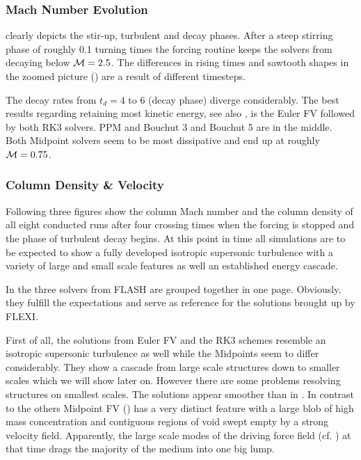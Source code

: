 \subsubsection{Mach Number Evolution}
 clearly depicts the stir-up,
turbulent and decay phases. After a steep stirring phase of roughly 0.1 turning
times the forcing routine keeps the solvers from decaying below $\mathcal{M} = 2.5$.
The differences in rising times and sawtooth shapes in the zoomed picture
() are a result of
different timesteps.

The decay rates from $t_d = 4$ to 6 (decay phase) diverge considerably.
The best results regarding retaining most kinetic energy, see also
, is the Euler FV followed by both RK3
solvers. PPM and Bouchut 3 and Bouchut 5 are in the middle. Both
Midpoint solvers seem to be most dissipative and end up at roughly $\mathcal{M} =
0.75$.

\subsubsection{Column Density \& Velocity}
\label{sec:stirturb-column-plots}
Following three figures show the column Mach number and the column density of
all eight conducted runs after four crossing times when the forcing is stopped
and the phase of turbulent decay begins. At this point in time all simulations
are to be expected to show a fully developed isotropic supersonic turbulence
with a variety of large and small scale features as well an established energy
cascade.

In  the three solvers from
FLASH are grouped together in one page. Obviously, they fulfill the
expectations and serve as reference for the solutions brought up by FLEXI.

First of all, the solutions from Euler FV and the RK3 schemes resemble an
isotropic supersonic turbulence as well while the Midpoints seem to differ
considerably. They show a cascade from large scale structures down to smaller
scales which we will show later on. However there are some problems resolving
structures on smallest scales. The solutions appear smoother than in
. In contrast to the others
Midpoint FV () has a very
distinct feature with a large blob of high mass concentration and
contiguous regions of void swept empty by a strong velocity field.
Apparently, the large scale modes of the driving force field (cf. )
at that time drags the majority of the medium into one big lump. 

